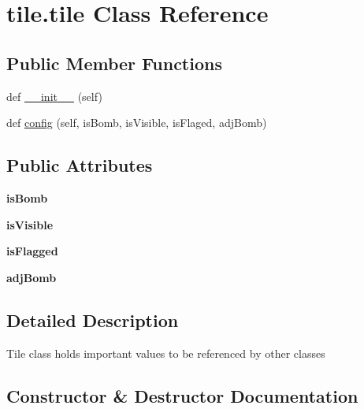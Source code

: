 \hypertarget{classtile_1_1tile}{}\section{tile.\+tile Class Reference}
\label{classtile_1_1tile}
\subsection*{Public Member Functions}
\begin{DoxyCompactItemize}
\item 
def \mbox{\hyperlink{classtile_1_1tile_a8a06fff9b10c8cb32195e21005d9ebc3}{\+\_\+\+\_\+init\+\_\+\+\_\+}} (self)
\item 
def \mbox{\hyperlink{classtile_1_1tile_ad7054ecde560f0a41204a149c806e351}{config}} (self, is\+Bomb, is\+Visible, is\+Flaged, adj\+Bomb)
\end{DoxyCompactItemize}
\subsection*{Public Attributes}
\begin{DoxyCompactItemize}
\item 
\mbox{\label{classtile_1_1tile_a0c5e73514e10b42dfb81b4362b079f07}} 
{\bfseries is\+Bomb}
\item 
\mbox{\label{classtile_1_1tile_a9cfb7110e4d0edcee61a9243bf460dc2}} 
{\bfseries is\+Visible}
\item 
\mbox{\label{classtile_1_1tile_a88352aeba615f4ed0f425c7bd7ac82b8}} 
{\bfseries is\+Flagged}
\item 
\mbox{\label{classtile_1_1tile_ad8524a450f8196ef6d5711ba050de1a4}} 
{\bfseries adj\+Bomb}
\end{DoxyCompactItemize}


\subsection{Detailed Description}
\begin{DoxyVerb}Tile class holds important values to be referenced by other classes\end{DoxyVerb}
 

\subsection{Constructor \& Destructor Documentation}
\mbox{\label{classtile_1_1tile_a8a06fff9b10c8cb32195e21005d9ebc3}} 
